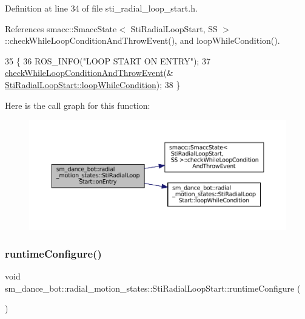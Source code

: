 Definition at line 34 of file sti\+\_\+radial\+\_\+loop\+\_\+start.\+h.



References smacc\+::\+Smacc\+State$<$ Sti\+Radial\+Loop\+Start, S\+S $>$\+::check\+While\+Loop\+Condition\+And\+Throw\+Event(), and loop\+While\+Condition().


\begin{DoxyCode}
35   \{
36     ROS\_INFO(\textcolor{stringliteral}{"LOOP START ON ENTRY"});
37     \hyperlink{classsmacc_1_1SmaccState_a80082718f226bebedb589f0c4696001d}{checkWhileLoopConditionAndThrowEvent}(&
      \hyperlink{structsm__dance__bot_1_1radial__motion__states_1_1StiRadialLoopStart_a05d31b8062dae8eccc4d66ab21a0b720}{StiRadialLoopStart::loopWhileCondition});
38   \}
\end{DoxyCode}
Here is the call graph for this function\+:
\nopagebreak
\begin{figure}[H]
\begin{center}
\leavevmode
\includegraphics[width=350pt]{structsm__dance__bot_1_1radial__motion__states_1_1StiRadialLoopStart_a83662aeb4d86fe809ea02bc186e32415_cgraph}
\end{center}
\end{figure}
\mbox{\label{structsm__dance__bot_1_1radial__motion__states_1_1StiRadialLoopStart_a5d61523a7767c515712bd2ec23e27571}} 
\subsubsection{\texorpdfstring{runtime\+Configure()}{runtimeConfigure()}}
{\footnotesize\ttfamily void sm\+\_\+dance\+\_\+bot\+::radial\+\_\+motion\+\_\+states\+::\+Sti\+Radial\+Loop\+Start\+::runtime\+Configure (\begin{DoxyParamCaption}{ }\end{DoxyParamCaption})\hspace{0.3cm}{\ttfamily [inline]}}



